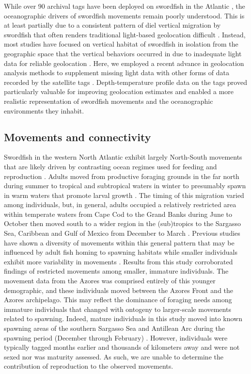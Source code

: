 While over 90 archival tags have been deployed on swordfish in the Atlantic \citep{Braun2015}, the oceanographic drivers of swordfish movements remain poorly understood. This is at least partially due to a consistent pattern of diel vertical migration by swordfish that often renders traditional light-based geolocation difficult \citep{Dewar2011, Lerner2013}. Instead, most studies have focused on vertical habitat of swordfish in isolation from the geographic space that the vertical behaviors occurred in due to inadequate light data for reliable geolocation \citep{Abecassis2012, Dewar2011, Evans2014, Loefer2007, Lerner2013}. Here, we employed a recent advance in geolocation analysis methods to supplement missing light data with other forms of data recorded by the satellite tags \citep[][Chapters \ref{chap:2}, \ref{chap:3}]{Braun2018a, Braun2018b}. Depth-temperature profile data on the tags proved particularly valuable for improving geolocation estimates and enabled a more realistic representation of swordfish movements and the oceanographic environments they inhabit.

\subsection{Movements and connectivity}%

Swordfish in the western North Atlantic exhibit largely North-South movements that are likely driven by contrasting ocean regimes used for feeding and reproduction \citep{Sedberry2001, Abascal2015}. Adults moved from productive foraging grounds in the far north during summer to tropical and subtropical waters in winter to presumably spawn in warm waters that promote larval growth \citep{Arocha1995}. The timing of this migration varied among individuals, but, in general, adults occupied a relatively restricted area within temperate waters from Cape Cod to the Grand Banks during June to October then moved south to a wider region in the (sub)tropics to the Sargasso Sea, Caribbean and Gulf of Mexico from December to March \citep{Neilson2009}. Previous studies have shown a diversity of movements within this general pattern that may be influenced by adult fish homing to spawning habitats \citep{Neilson2009} while smaller individuals exhibit more variability in movements \citep{Abascal2015}. Results from this study corroborated findings of restricted movements among smaller, immature individuals. The movement data from the Azores was comprised entirely of this younger demographic, and these individuals moved between the Azores Front and the Azores archipelago. This may reflect the dominance of foraging needs among immature individuals that changed with ontogeny to larger-scale movements related to spawning. Indeed, mature individuals in this study moved into known spawning areas of the southern Sargasso Sea and Antillean Arc during the spawning period (December through February) \citep{Neilson2013}. However, individuals were typically tagged months earlier and thousands of kilometers away and were not sexed nor was maturity assessed. As such, we are unable to determine the contribution of reproduction to the observed movements.


